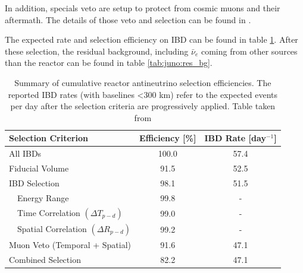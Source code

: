 \documentclass[../main.tex]{subfiles}
\begin{document}
In addition, specials veto are setup to protect from cosmic muons and their aftermath. The details of those veto and selection can be found in \cite{abusleme_potential_2024}.

The expected rate and selection efficiency on IBD can be found in table \ref{tab:juno:ibd_selection}. After these selection, the residual background, including $\bar{\nu}_e$ coming from other sources than the reactor can be found in table \ref{tab:juno:res_bg}.

\begin{table}[ht]
  \centering
  \begin{tabular}{l|c|c}
    \hline
    Selection Criterion & Efficiency [\%] & IBD Rate [day$^{-1}$] \\
    \hline
    All IBDs            & 100.0           & 57.4 \\
    Fiducial Volume     & 91.5            & 52.5 \\
    IBD Selection       & 98.1            & 51.5 \\
    ~~Energy Range      & 99.8            & - \\
    ~~Time Correlation $(\Delta T_{p - d})$    & 99.0    & - \\
    ~~Spatial Correlation $(\Delta R_{p - d})$ & 99.2    & - \\
    Muon Veto (Temporal + Spatial)        & 91.6    & 47.1 \\
    \hline
    Combined Selection & 82.2             &47.1 \\
    \hline
  \end{tabular}
  \caption{Summary of cumulative reactor antineutrino selection efficiencies. The reported IBD rates (with baselines <300 km) refer to the expected events per day after the selection criteria are progressively applied. Table taken from \cite{abusleme_potential_2024}}
  \label{tab:juno:ibd_selection}
\end{table}
\end{document}
